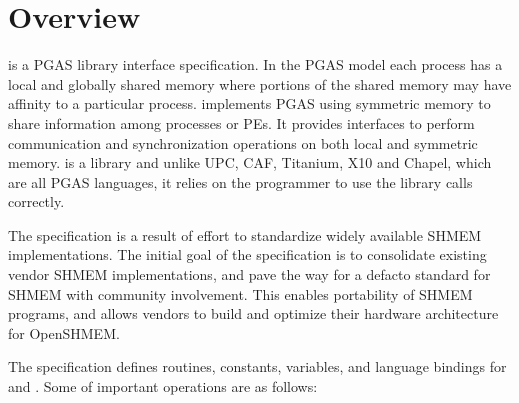 \section{Overview}
\openshmem is a \ac{PGAS} library interface specification. In the \ac{PGAS} model each process has a local and 
globally shared memory where portions of the shared memory may have affinity to a particular process. \openshmem 
implements \ac{PGAS} using symmetric memory to share information among processes or \ac{PE}s.   
It provides interfaces to perform communication and synchronization operations on both local and symmetric memory. 
\openshmem is a library and unlike UPC, CAF, Titanium, X10 and Chapel, which are all
PGAS languages, it relies on the programmer to use the library calls correctly.

The \openshmem specification is a result of effort to standardize widely available SHMEM implementations. 
The initial goal of the specification is to consolidate existing vendor SHMEM implementations, and  pave the way for 
a defacto standard for SHMEM with community involvement. This enables portability of SHMEM programs, and 
allows vendors to build and optimize their hardware architecture for OpenSHMEM.

The \openshmem specification defines routines, constants, variables, and language bindings for \Clang and \Fortran.
Some of important \openshmem{} operations are as follows:

